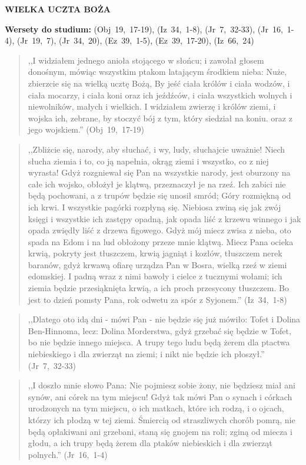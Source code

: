 \documentclass[10pt,a4paper,oneside]{article}
\begin{document}
\centerline{\textbf{\MakeUppercase{Wielka uczta Boża}}}
\begin{center}
\textbf{Wersety do studium:} \mbox{(Obj 19, 17-19)}, \mbox{(Iz 34, 1-8)}, \mbox{(Jr 7, 32-33)}, \mbox{(Jr 16, 1-4)}, \mbox{(Jr 19, 7)}, \mbox{(Jr 34, 20)}, \mbox{(Ez 39, 1-5)}, \mbox{(Ez 39, 17-20)}, \mbox{(Iz 66, 24)}
\end{center}
\begin{quote}
,,I widziałem jednego anioła stojącego w słońcu; i zawołał głosem donośnym, mówiąc wszystkim ptakom latającym środkiem nieba: Nuże, zbierzcie się na wielką ucztę Bożą, By jeść ciała królów i ciała wodzów, i ciała mocarzy, i ciała koni oraz ich jeźdźców, i ciała wszystkich wolnych i niewolników, małych i wielkich. I widziałem zwierzę i królów ziemi, i wojska ich, zebrane, by stoczyć bój z tym, który siedział na koniu. oraz z jego wojskiem.'' \mbox{(Obj 19, 17-19)}
\end{quote}
\begin{quote}
,,Zbliżcie się, narody, aby słuchać, i wy, ludy, słuchajcie uważnie! Niech słucha ziemia i to, co ją napełnia, okrąg ziemi i wszystko, co z niej wyrasta! Gdyż rozgniewał się Pan na wszystkie narody, jest oburzony na całe ich wojsko, obłożył je klątwą, przeznaczył je na rzeź. Ich zabici nie będą pochowani, a z trupów będzie się unosił smród; Góry rozmiękną od ich krwi. I wszystkie pagórki rozpłyną się. Niebiosa zwiną się jak zwój księgi i wszystkie ich zastępy opadną, jak opada liść z krzewu winnego i jak opada zwiędły liść z drzewa figowego. Gdyż mój miecz zwisa z nieba, oto spada na Edom i na lud obłożony przeze mnie klątwą. Miecz Pana ocieka krwią, pokryty jest tłuszczem, krwią jagniąt i kozłów, tłuszczem nerek baranów, gdyż krwawą ofiarę urządza Pan w Bosra, wielką rzeź w ziemi edomskiej. I padną wraz z nimi bawoły i cielce z tucznymi wołami; ich ziemia będzie przesiąknięta krwią, a ich proch przesycony tłuszczem. Bo jest to dzień pomsty Pana, rok odwetu za spór z Syjonem.'' \mbox{(Iz 34, 1-8)}
\end{quote}
\begin{quote}
,,Dlatego oto idą dni - mówi Pan - nie będzie się już mówiło: Tofet i Dolina Ben-Hinnoma, lecz: Dolina Morderstwa, gdyż grzebać się będzie w Tofet, bo nie będzie innego miejsca. A trupy tego ludu będą żerem dla ptactwa niebieskiego i dla zwierząt na ziemi; i nikt nie będzie ich płoszył.'' \mbox{(Jr 7, 32-33)}
\end{quote}
\begin{quote}
,,I doszło mnie słowo Pana: Nie pojmiesz sobie żony, nie będziesz miał ani synów, ani córek na tym miejscu! Gdyż tak mówi Pan o synach i córkach urodzonych na tym miejscu, o ich matkach, które ich rodzą, i o ojcach, którzy ich płodzą w tej ziemi. Śmiercią od straszliwych chorób pomrą, nie będą opłakiwani ani grzebani, staną się gnojem na roli; zginą od miecza i głodu, a ich trupy będą żerem dla ptaków niebieskich i dla zwierząt polnych.'' \mbox{(Jr 16, 1-4)}
\end{quote}
\end{document}
